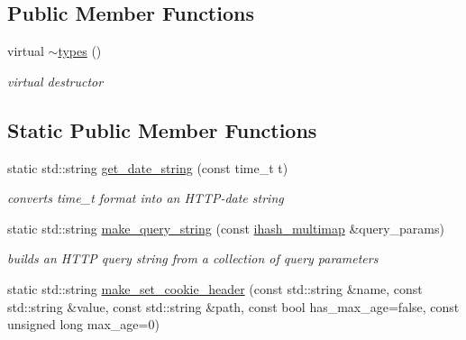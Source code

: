 \subsection*{Public Member Functions}
\begin{DoxyCompactItemize}
\item 
virtual \hyperlink{structpion_1_1http_1_1types_abb9f73024856ac4c582259781a70b02b}{$\sim$types} ()
\begin{DoxyCompactList}\small\item\em virtual destructor \end{DoxyCompactList}\end{DoxyCompactItemize}
\subsection*{Static Public Member Functions}
\begin{DoxyCompactItemize}
\item 
static std\-::string \hyperlink{structpion_1_1http_1_1types_a7772dbeb3b5bdde2387f8899d358087e}{get\-\_\-date\-\_\-string} (const time\-\_\-t t)
\begin{DoxyCompactList}\small\item\em converts time\-\_\-t format into an H\-T\-T\-P-\/date string \end{DoxyCompactList}\item 
static std\-::string \hyperlink{structpion_1_1http_1_1types_aa8d84f3f7199fc20715d67d096ecfa9b}{make\-\_\-query\-\_\-string} (const \hyperlink{namespacepion_a2cd31d7bbe0e98008bd4e6f135103c0e}{ihash\-\_\-multimap} \&query\-\_\-params)
\begin{DoxyCompactList}\small\item\em builds an H\-T\-T\-P query string from a collection of query parameters \end{DoxyCompactList}\item 
static std\-::string \hyperlink{structpion_1_1http_1_1types_a1908960aabfff3e1c263018f659f62c0}{make\-\_\-set\-\_\-cookie\-\_\-header} (const std\-::string \&name, const std\-::string \&value, const std\-::string \&path, const bool has\-\_\-max\-\_\-age=false, const unsigned long max\-\_\-age=0)
\end{DoxyCompactItemize}
